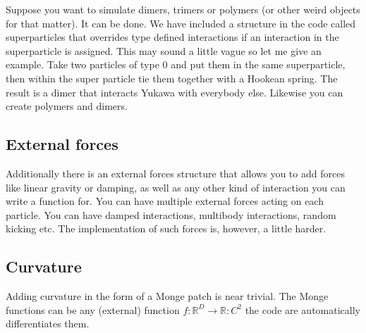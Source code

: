 \documentclass[11pt,a4paper,oneside]{report}
\newcommand{\subsect}[1]{\subsection{#1} \setcounter{equation}{0}}
\begin{document}
Suppose you want to simulate dimers, trimers or polymers (or other weird objects for that matter). It can be done. We have included a structure in the code called superparticles that overrides type defined interactions if an interaction in the superparticle is assigned. This may sound a little vague so let me give an example. Take two particles of type $0$ and put them in the same superparticle, then within the super particle tie them together with a Hookean spring. The result is a dimer that interacts Yukawa with everybody else. Likewise you can create polymers and dimers. 
\subsect{External forces}
Additionally there is an external forces structure that allows you to add forces like linear gravity or damping, as well as any other kind of interaction you can write a function for. You can have multiple external forces acting on each particle. You can have damped interactions, multibody interactions, random kicking etc. The implementation of such forces is, however, a little harder.
\subsect{Curvature}
Adding curvature in the form of a Monge patch is near trivial. The Monge functions can be any (external) function $f: \mathds{R}^D \rightarrow \mathds{R} : C^2$ the code are automatically differentiates them.
\end{document}

